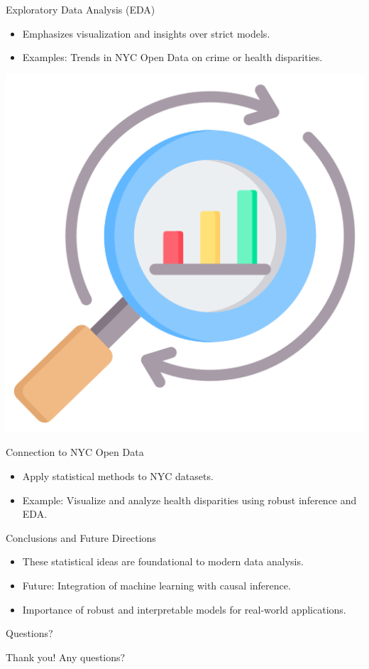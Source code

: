 \documentclass{beamer}
\begin{document}
\begin{frame}{Exploratory Data Analysis (EDA)}
\begin{itemize}
    \item Emphasizes visualization and insights over strict models.
    \item Examples: Trends in NYC Open Data on crime or health disparities.
\end{itemize}

\includegraphics[width=\textwidth]{example-plot.png} %
\end{frame}

\begin{frame}{Connection to NYC Open Data}
\begin{itemize}
    \item Apply statistical methods to NYC datasets.
    \item Example: Visualize and analyze health disparities using robust inference and EDA.
\end{itemize}
\end{frame}

\begin{frame}{Conclusions and Future Directions}
\begin{itemize}
    \item These statistical ideas are foundational to modern data analysis.
    \item Future: Integration of machine learning with causal inference.
    \item Importance of robust and interpretable models for real-world applications.
\end{itemize}
\end{frame}

\begin{frame}{Questions?}
\begin{center}
    Thank you! Any questions?
\end{center}
\end{frame}
\end{document}
